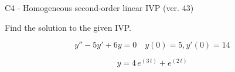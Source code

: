 \begin{exercise}
  \begin{exerciseTitle}C4 - Homogeneous second-order linear IVP (ver. 43)\end{exerciseTitle}
  \begin{exerciseStatement}
    
Find the solution to the given IVP.

    
\[y''-5y'+6y = 0 \hspace{1em} y(0) = 5 , y'(0) = 14\]

  \end{exerciseStatement}
  \begin{exerciseAnswer}
    
\[y= 4 \, e^{\left(3 \, t\right)} + e^{\left(2 \, t\right)}\]

  \end{exerciseAnswer}
\end{exercise}
